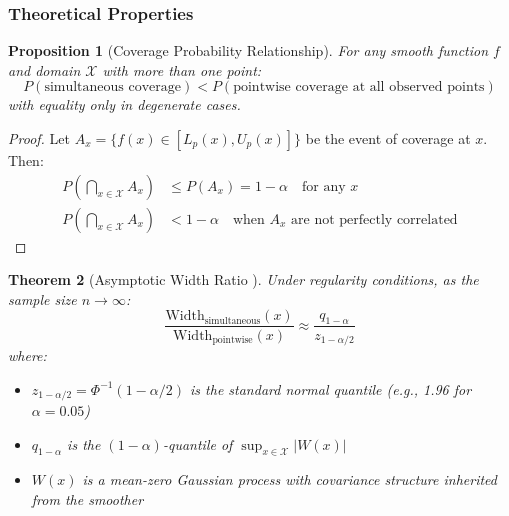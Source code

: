 \documentclass[12pt]{article}
\newtheorem{theorem}{Theorem}
\newtheorem{proposition}[theorem]{Proposition}
\begin{document}
\subsubsection{Theoretical Properties}

\begin{proposition}[Coverage Probability Relationship]
For any smooth function $f$ and domain $\mathcal{X}$ with more than one point:
\begin{equation}
P(\text{simultaneous coverage}) < P(\text{pointwise coverage at all observed points})
\end{equation}
with equality only in degenerate cases.
\end{proposition}

\begin{proof}
Let $A_x = \{f(x) \in [L_p(x), U_p(x)]\}$ be the event of coverage at $x$. Then:
\begin{align}
P\left(\bigcap_{x \in \mathcal{X}} A_x\right) &\leq P(A_x) = 1-\alpha \quad \text{for any } x \\
P\left(\bigcap_{x \in \mathcal{X}} A_x\right) &< 1-\alpha \quad \text{when } A_x \text{ are not perfectly correlated}
\end{align}
\end{proof}

\begin{theorem}[Asymptotic Width Ratio ]
Under regularity conditions, as the sample size $n \to \infty$:
\begin{equation}
\frac{\text{Width}_{\text{simultaneous}}(x)}{\text{Width}_{\text{pointwise}}(x)} \approx \frac{q_{1-\alpha}}{z_{1-\alpha/2}}
\end{equation}
where:
\begin{itemize}
   \item $z_{1-\alpha/2} = \Phi^{-1}(1-\alpha/2)$ is the standard normal quantile (e.g., 1.96 for $\alpha=0.05$)
   \item $q_{1-\alpha}$ is the $(1-\alpha)$-quantile of $\sup_{x \in \mathcal{X}} |W(x)|$
   \item $W(x)$ is a mean-zero Gaussian process with covariance structure inherited from the smoother
\end{itemize}
\end{theorem}
\end{document}
